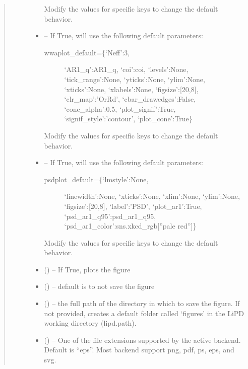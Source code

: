 \documentclass[letterpaper,10pt,english]{sphinxmanual}
\begin{document}
\begin{fulllineitems}
\begin{quote}
\begin{description}
\begin{itemize}
Modify the values for specific keys to change the default behavior.


\item {} 
 -- 
If True, will use the following default parameters:
\begin{description}
\item[{wwaplot\_default=\{`Neff':3,}] \leavevmode
`AR1\_q':AR1\_q,
`coi':coi,
`levels':None,
`tick\_range':None,
`yticks':None,
`ylim':None,
`xticks':None,
`xlabels':None,
`figsize':{[}20,8{]},
`clr\_map':'OrRd',
`cbar\_drawedges':False,
`cone\_alpha':0.5,
`plot\_signif':True,
`signif\_style':'contour',
`plot\_cone':True\}

\end{description}

Modify the values for specific keys to change the default behavior.


\item {} 
 -- 
If True, will use the following default parameters:
\begin{description}
\item[{psdplot\_default=\{`lmstyle':None,}] \leavevmode
`linewidth':None,
`xticks':None,
`xlim':None,
`ylim':None,
`figsize':{[}20,8{]},
`label':'PSD',
`plot\_ar1':True,
`psd\_ar1\_q95':psd\_ar1\_q95,
`psd\_ar1\_color':sns.xkcd\_rgb{[}''pale red''{]}\}

\end{description}

Modify the values for specific keys to change the default behavior.


\item {} 
 () -- If True, plots the figure

\item {} 
 () -- default is to not save the figure

\item {} 
 () -- the full path of the directory in which to save the figure.
If not provided, creates a default folder called `figures' in the
LiPD working directory (lipd.path).

\item {} 
 () -- One of the file extensions supported by the active
backend. Default is ``eps''. Most backend support png, pdf, ps, eps,
and svg.


\end{itemize}
\end{description}
\end{quote}
\end{fulllineitems}
\end{document}
